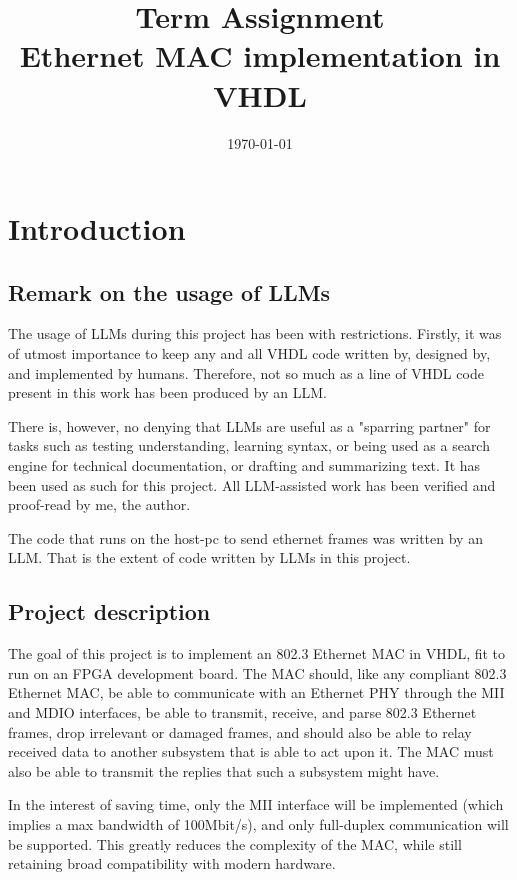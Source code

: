 \documentclass[11pt,a4paper]{article}
\title{
    \Huge\bfseries Term Assignment\\[0.5em]
    \large\normalfont Ethernet MAC implementation in VHDL\\
    \vspace{1cm}
}
\author{
    
}
\date{\today}
\begin{document}
\maketitle
\vfill
\vspace{1cm}

\newpage

\tableofcontents

\newpage

\section{Introduction}
\subsection{Remark on the usage of LLMs}
The usage of LLMs during this project has been with restrictions.
Firstly, it was of utmost importance to keep any and all VHDL code written by, designed by, and implemented by humans.
Therefore, not so much as a line of VHDL code present in this work has been produced by an LLM.

There is, however, no denying that LLMs are useful as a "sparring partner" for tasks such as testing understanding, learning syntax, or being used as a search engine for technical documentation, or drafting and summarizing text.
It has been used as such for this project. All LLM-assisted work has been verified and proof-read by me, the author.

The code that runs on the host-pc to send ethernet frames was written by an LLM. That is the extent of code written by LLMs in this project.

\subsection{Project description}
The goal of this project is to implement an 802.3 Ethernet MAC in VHDL, fit to run on an FPGA development board.
The MAC should, like any compliant 802.3 Ethernet MAC, be able to communicate with an Ethernet PHY through the MII and MDIO interfaces, be able to transmit, receive, and parse 802.3 Ethernet frames, drop irrelevant or damaged frames, and should also be able to relay received data to another subsystem that is able to act upon it.
The MAC must also be able to transmit the replies that such a subsystem might have.

In the interest of saving time, only the MII interface will be implemented (which implies a max bandwidth of 100Mbit/s), and only full-duplex communication will be supported.
This greatly reduces the complexity of the MAC, while still retaining broad compatibility with modern hardware.
\end{document}
